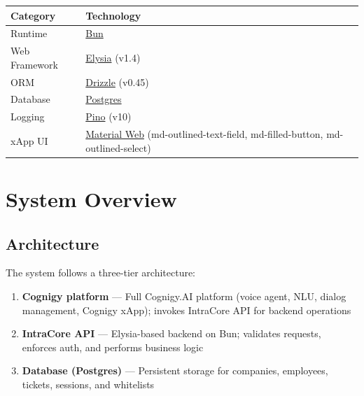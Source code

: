 \documentclass{article}
\begin{document}
\begin{table}[H]
  \centering
  \begin{tabular}{@{}ll@{}}
    \toprule
    \textbf{Category} & \textbf{Technology} \\
    \midrule
    Runtime & \href{https://bun.com}{Bun} \\
    Web Framework & \href{https://elysiajs.com}{Elysia} (v1.4) \\
    ORM & \href{https://orm.drizzle.team}{Drizzle} (v0.45) \\
    Database & \href{https://postgresql.org}{Postgres} \\
    Logging & \href{https://github.com/pinojs/pino}{Pino} (v10) \\
    xApp UI & \href{https://github.com/material-components/material-web}{Material Web} (md-outlined-text-field, md-filled-button, md-outlined-select) \\
    \bottomrule
  \end{tabular}
\end{table}

\clearpage
\section{System Overview}

\subsection{Architecture}
The system follows a three-tier architecture:

\begin{enumerate}[noitemsep]
  \item \textbf{Cognigy platform} --- Full Cognigy.AI platform (voice agent, NLU, dialog management, Cognigy xApp); invokes IntraCore API for backend operations
  \item \textbf{IntraCore API} --- Elysia-based backend on Bun; validates requests, enforces auth, and performs business logic
  \item \textbf{Database (Postgres)} --- Persistent storage for companies, employees, tickets, sessions, and whitelists
\end{enumerate}
\end{document}
